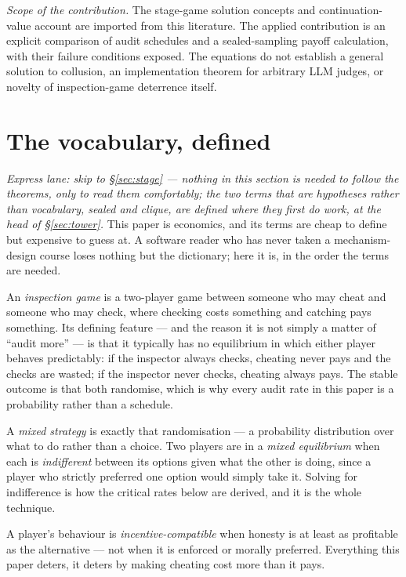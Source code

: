 \documentclass[11pt,a4paper]{article}
\begin{document}
\emph{Scope of the contribution.} The stage-game solution concepts and continuation-value account are imported from this literature. The applied contribution is an explicit comparison of audit schedules and a sealed-sampling payoff calculation, with their failure conditions exposed. The equations do not establish a general solution to collusion, an implementation theorem for arbitrary LLM judges, or novelty of inspection-game deterrence itself.

\section{The vocabulary, defined}\label{sec:vocab}

\emph{Express lane: skip to \S\ref{sec:stage} --- nothing in this section is needed to follow the theorems, only to read them comfortably; the two terms that are hypotheses rather than vocabulary, \emph{sealed} and \emph{clique}, are defined where they first do work, at the head of \S\ref{sec:tower}.} This paper
is economics, and its terms are cheap to define but expensive to guess at. A software reader who has never taken
a mechanism-design course loses nothing but the dictionary; here it is, in the order the terms are needed.

An \emph{inspection game} is a two-player game between someone who may cheat and someone who may check, where checking
costs something and catching pays something. Its defining feature --- and the reason it is not simply a matter of ``audit
more'' --- is that it typically has no equilibrium in which either player behaves predictably: if the inspector always
checks, cheating never pays and the checks are wasted; if the inspector never checks, cheating always pays. The stable
outcome is that both randomise, which is why every audit rate in this paper is a probability rather than a schedule.

A \emph{mixed strategy} is exactly that randomisation --- a probability distribution over what to do rather than a choice.
Two players are in a \emph{mixed equilibrium} when each is \emph{indifferent} between its options given what the other is
doing, since a player who strictly preferred one option would simply take it. Solving for indifference is how the critical
rates below are derived, and it is the whole technique.

A player's behaviour is \emph{incentive-compatible} when honesty is at least as profitable as the alternative --- not when
it is enforced or morally preferred. Everything this paper deters, it deters by making cheating cost more than it pays.
\end{document}
